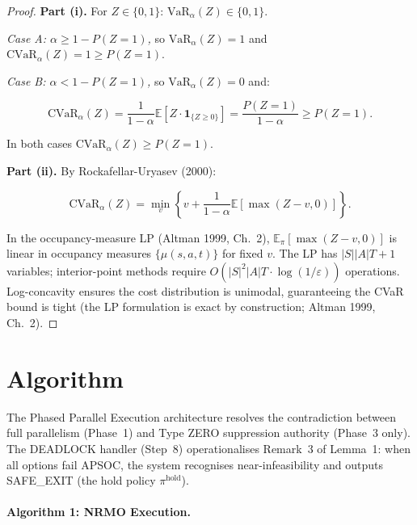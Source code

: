 \begin{proof}
\medskip\noindent\textbf{Part (i).}
For $Z \in \{0, 1\}$: $\mathrm{VaR}_\alpha(Z) \in \{0, 1\}$.

\medskip\noindent\textit{Case A: $\alpha \ge 1 - P(Z = 1)$,} so
$\mathrm{VaR}_\alpha(Z) = 1$ and $\mathrm{CVaR}_\alpha(Z) = 1 \ge
P(Z = 1)$.

\medskip\noindent\textit{Case B: $\alpha < 1 - P(Z = 1)$,} so
$\mathrm{VaR}_\alpha(Z) = 0$ and:

\begin{equation}
\mathrm{CVaR}_\alpha(Z) = \frac{1}{1 - \alpha}
\mathbb{E}[Z \cdot \mathbf{1}_{\{Z \ge 0\}}]
= \frac{P(Z = 1)}{1 - \alpha} \ge P(Z = 1).
\end{equation}

In both cases $\mathrm{CVaR}_\alpha(Z) \ge P(Z = 1)$.

\medskip\noindent\textbf{Part (ii).}
By Rockafellar-Uryasev (2000):

\begin{equation}
\mathrm{CVaR}_\alpha(Z) =
\min_v\!\left\{v + \frac{1}{1 - \alpha}
\mathbb{E}[\max(Z - v, 0)]\right\}.
\end{equation}

In the occupancy-measure LP (Altman 1999, Ch.~2),
$\mathbb{E}_\pi[\max(Z - v, 0)]$ is linear in occupancy measures
$\{\mu(s, a, t)\}$ for fixed $v$. The LP has $|S| |A| T + 1$
variables; interior-point methods require $O(|S|^2 |A| T \cdot
\log(1 / \varepsilon))$ operations. Log-concavity ensures the cost
distribution is unimodal, guaranteeing the CVaR bound is tight (the
LP formulation is exact by construction; Altman 1999, Ch.~2).
\end{proof}

\section{Algorithm}
\label{sec:arxiv-algorithm}

The Phased Parallel Execution architecture resolves the
contradiction between full parallelism (Phase~1) and Type ZERO
suppression authority (Phase~3 only). The DEADLOCK handler (Step~8)
operationalises Remark~3 of Lemma~1: when all options fail APSOC,
the system recognises near-infeasibility and outputs SAFE\_EXIT
(the hold policy $\pi^{\mathrm{hold}}$).

\paragraph{Algorithm 1: NRMO Execution.}

